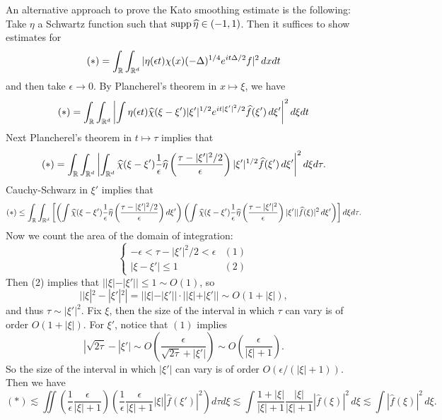 \begin{remark}
  An alternative approach to prove the Kato smoothing
  estimate is the following: Take $\eta$ a
  Schwartz function such that
  $\operatorname{supp} \widehat{\eta} \in (-1, 1)$. Then it suffices
  to show estimates for
  \[
    (*) = \int_{\mathbb{R}} \int_{\mathbb{R}^d}
    |\eta(\epsilon t) \chi(x) (-\Delta)^{1 / 4} e^{it \Delta / 2} f|^2\, dx dt
  \]
  and then take $\epsilon \to 0$. By Plancherel's
  theorem in $x \mapsto \xi$, we have
  \[
    (*) = \int_{\mathbb{R}} \int_{\mathbb{R}^d}
    \left| \int \eta(\epsilon t) \widehat{\chi}(\xi - \xi') |\xi'|^{1 / 2} e^{it|\xi'|^2 / 2} \widehat{f}(\xi')\, d\xi' \right|^2 d\xi dt
  \]
  Next Plancherel's theorem in $t \mapsto \tau$
  implies that
  \[
    (*) = \int_{\mathbb{R}} \int_{\mathbb{R}^d}
    \left|
    \int_{\mathbb{R}^d} \widehat{\chi}(\xi - \xi')
    \frac{1}{\epsilon} \widehat{\eta}\left(\frac{\tau - |\xi'|^2 / 2}{\epsilon}\right) |\xi'|^{1 / 2} \widehat{f}(\xi')\, d\xi'
    \right|^2 d\xi d\tau.
  \]
  Cauchy-Schwarz in $\xi'$ implies that
  \[
    (*) \le
    \int_{\mathbb{R}} \int_{\mathbb{R}^d}
    \left[\left(\int \widehat{\chi}(\xi - \xi') \frac{1}{\epsilon} \widehat{\eta}\left(\frac{\tau - |\xi'|^2 / 2}{\epsilon}\right) d\xi'\right)
    \left(\int \widehat{\chi}(\xi - \xi') \frac{1}{\epsilon} \widehat{\eta} \left(\frac{\tau - |\xi'|^2}{\epsilon}\right) |\xi'| |\widehat{f}(\xi)|^2\, d\xi'\right)\right]
    d\xi d\tau
  .\]
  Now we count the area of the domain of integration:
  \[
    \begin{cases}
      -\epsilon < \tau - |\xi'|^2 / 2 < \epsilon & (1) \\
      |\xi - \xi'| \le 1 & (2)
    \end{cases}
  \]
  Then (2) implies that
  $||\xi| - |\xi'|| \le 1 \sim O(1)$, so
  \[
    ||\xi|^2 - |\xi'|^2|
    = ||\xi| - |\xi'|| \cdot ||\xi| + |\xi'||
    \sim O(1 + |\xi|),
  \]
  and thus $\tau \sim |\xi'|^2$. Fix $\xi$, then
  the size of the interval in which $\tau$ can vary
  is of order $O(1 + |\xi|)$. For $\xi'$,
  notice that $(1)$ implies
  \[
    |\sqrt{2\tau} - |\xi'|
    \sim O\left(\frac{\epsilon}{\sqrt{2\tau} + |\xi'|}\right)
    \sim O\left(\frac{\epsilon}{|\xi| + 1}\right).
  \]
  So the size of the interval in which
  $|\xi'|$ can vary is of order
  $O(\epsilon / (|\xi| + 1))$.  Then we have
  \[
    (*) \lesssim \iint \left(\frac{1}{\epsilon} \frac{\epsilon}{|\xi| + 1}\right)\left(\frac{1}{\epsilon} \frac{\epsilon}{|\xi| + 1}|\xi| |\widehat{f}(\xi')|^2\right) d\tau d\xi
    \lesssim \int \frac{1+ |\xi|}{|\xi| + 1} \frac{|\xi|}{|\xi| + 1} |\widehat{f}(\xi)|^2 \, d\xi
    \lesssim \int |\widehat{f}(\xi)|^2 \, d\xi.
  \]
\end{remark}
